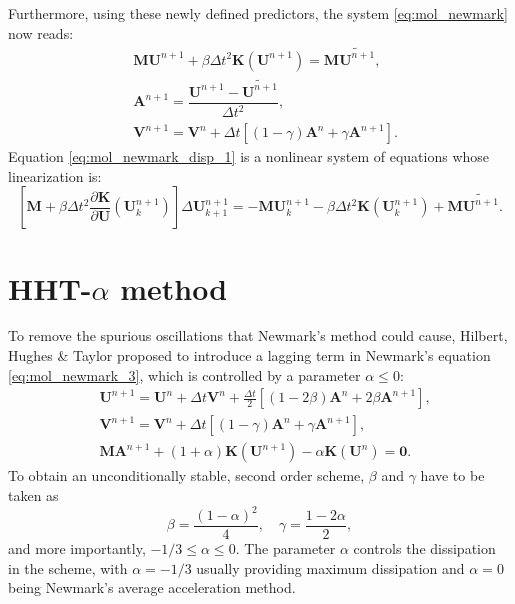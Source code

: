 \documentclass{sfuthesis}
\numberwithin{equation}{section}
\numberwithin{figure}{chapter}
\numberwithin{table}{chapter}
\theoremstyle{definition}
\def\*#1{{\mathbf{#1}}} %
\newcommand{\pder}[2]{\dfrac{\partial #1}{\partial #2}}
\begin{document}
Furthermore, using these newly defined predictors, the system \eqref{eq:mol_newmark} now reads:
\begin{subequations}
    \begin{align}
    \label{eq:mol_newmark_disp_1} & \*M \*U^{n+1} + \beta \Delta t^2 \*K(\*U^{n+1}) = \*M \widetilde{\*U^{n+1}}, \\
	& \*A^{n+1} = \dfrac{\*U^{n+1} - \widetilde{\*U^{n+1}}}{\Delta t^2}, \\
	& \*V^{n+1} = \*V^n + \Delta t \left[ (1-\gamma) \*A^n + \gamma \*A^{n+1} \right].
    \end{align}
\end{subequations}
Equation \eqref{eq:mol_newmark_disp_1} is a nonlinear system of equations whose linearization is:
\begin{equation}
	\left[ \*M + \beta \Delta t^2 \pder{\*K}{\*U}(\*U_k^{n+1}) \right] \Delta \*U_{k+1}^{n+1} = -\*M \*U_k^{n+1} - \beta \Delta t^2 \*K(\*U_k^{n+1}) + \*M \widetilde{\*U^{n+1}}.
\end{equation}

\section{HHT-$\alpha$ method} \label{sec:hht_alpha_method}

To remove the spurious oscillations that Newmark's method could cause, Hilbert, Hughes \& Taylor \cite{HHTalpha} proposed to introduce a lagging term in Newmark's equation \eqref{eq:mol_newmark_3}, which is controlled by a parameter $\alpha \leq 0$:
\begin{subequations} \label{eq:mol_hht}
    \begin{align}
        &\*U^{n+1} = \*U^n + \Delta t \*V^n + \frac{\Delta t}{2} \left[ (1-2\beta) \*A^n + 2\beta \*A^{n+1} \right], \\
	    &\*V^{n+1} = \*V^n + \Delta t \left[ (1-\gamma) \*A^n + \gamma \*A^{n+1} \right], \\
	    &\*M \*A^{n+1} + (1+\alpha)\*K(\*U^{n+1}) - \alpha\*K(\*U^{n}) = \*0.
    \end{align}
\end{subequations}
To obtain an unconditionally stable, second order scheme, $\beta$ and $\gamma$ have to be taken as
\[
    \beta = \frac{(1-\alpha)^2}{4}, \quad \gamma = \frac{1-2\alpha}{2},
\]
and more importantly, $-1/3 \leq \alpha \leq 0$. The parameter $\alpha$ controls the dissipation in the scheme, with $\alpha=-1/3$ usually providing maximum dissipation and $\alpha=0$ being Newmark's average acceleration method.
\end{document}
